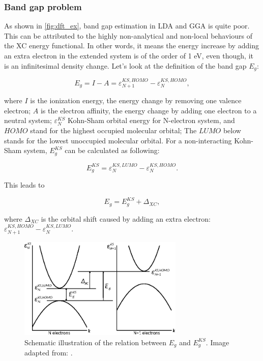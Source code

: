 \subsubsection{Band gap problem}

As shown in \autoref{fig:dft_ex}, band gap estimation in LDA and GGA is quite poor. This can be attributed to the highly non-analytical and non-local behaviours of the XC energy functional. In other words, it means the energy increase by adding an extra electron in the extended system is of the order of 1 eV, even though, it is an infinitesimal density change. Let's look at the definition of the band gap $E_{g}$:

\begin{equation}
E_{g}=I-A=\varepsilon_{N+1}^{KS,HOMO}-\varepsilon_N^{KS,HOMO},
\end{equation}

where $I$ is the ionization energy, the energy change by removing one valence electron; $A$ is the electron affinity, the energy change by adding one electron to a neutral system; $\varepsilon_N^{KS}$ Kohn-Sham orbital energy for N-electron system, and $HOMO$ stand for the highest occupied molecular orbital; The $LUMO$ below stands for the lowest unoccupied molecular orbital. For a non-interacting Kohn-Sham system, $E_{g}^{KS}$ can be calculated as following:

\begin{equation}
E_{g}^{KS}=\varepsilon_{N}^{KS,LUMO}-\varepsilon_{N}^{KS,HOMO}.
\end{equation}

This leads to 

\begin{equation}
E_{g}=E_{g}^{KS}+\Delta_{XC},
\end{equation}

where $\Delta_{XC}$ is the orbital shift caused by adding an extra electron: $\varepsilon_{N+1}^{KS,HOMO}-\varepsilon_{N}^{KS,LUMO}$.

\begin{figure}[htbp!] 
\centering  
\includegraphics[width=0.7\textwidth]{Eg.eps}
\caption{ Schematic illustration of the relation between $E_g$ and $E^{KS}_g$. Image adapted from: \cite{fiolhais2008primer}.}  
\label{fig:dft_eg}
\end{figure} 

